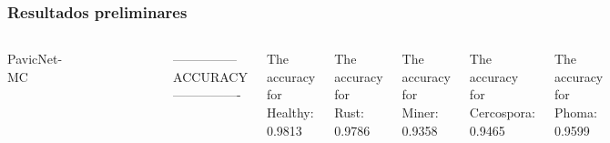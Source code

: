 \documentclass[aspectratio=169]{beamer}
\begin{document}





\begin{frame}
    \frametitle{Resultados preliminares}


    \begin{columns}



        \centering
        PavicNet-MC

        \begin{figure}
            \centering
            \includegraphics[scale = 0.5]{img/pavicnetV4.png}
            \label{fig:enter-label}
        \end{figure}



        --------------- ACCURACY ----------------

        The accuracy for Healthy: 0.9813

        The accuracy for Rust: 0.9786

        The accuracy for Miner: 0.9358

        The accuracy for Cercospora: 0.9465

        The accuracy for Phoma: 0.9599


\end{columns}
\end{frame}
\end{document}

